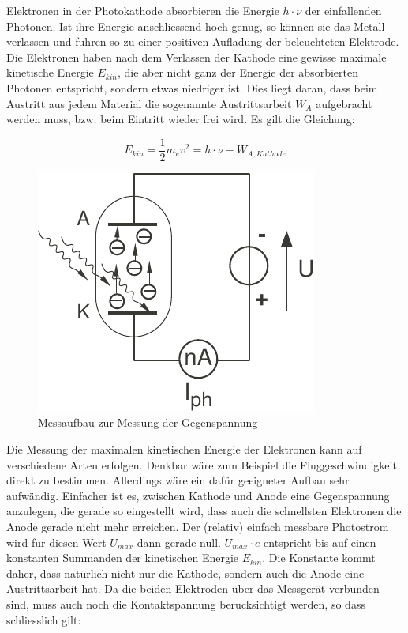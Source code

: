 Elektronen  in  der  Photokathode  absorbieren  die  Energie  $h\cdot\nu$  der
einfallenden Photonen. Ist ihre Energie anschliessend hoch  genug, so k\"onnen
sie das Metall  verlassen  und  fuhren  so  zu  einer  positiven Aufladung der
beleuchteten Elektrode. Die Elektronen haben nach  dem  Verlassen  der Kathode
eine  gewisse  maximale  kinetische Energie $E_{kin}$, die aber nicht ganz der
Energie  der absorbierten Photonen entspricht, sondern  etwas  niedriger  ist.
Dies  liegt  daran,  dass  beim  Austritt  aus  jedem Material die  sogenannte
Austrittsarbeit  $W_A$ aufgebracht werden muss, bzw. beim Eintritt wieder frei
wird. Es gilt die Gleichung:

\begin{equation}
    E_{kin} = \frac{1}{2}m_e v^2 = h\cdot\nu - W_{A,Kathode}
\end{equation}

\begin{figure}
    \centering
    \includegraphics[width=\linewidth]{images/millikan.pdf}
    \caption{Messaufbau zur Messung der Gegenspannung}
    \label{fig:millikan}
\end{figure}

Die  Messung  der  maximalen  kinetischen  Energie  der  Elektronen  kann  auf
verschiedene   Arten   erfolgen.   Denkbar    w\"are    zum    Beispiel    die
Fluggeschwindigkeit  direkt  zu  bestimmen.  Allerdings  w\"are   ein  daf\"ur
geeigneter Aufbau  sehr  aufw\"andig.  Einfacher  ist es, zwischen Kathode und
Anode  eine Gegenspannung anzulegen, die gerade so eingestellt wird, dass auch
die  schnellsten  Elektronen  die  Anode  gerade  nicht  mehr  erreichen.  Der
(relativ) einfach  messbare  Photostrom  wird  fur  diesen Wert $U_{max}$ dann
gerade  null.  $U_{max}\cdot e$ entspricht bis auf einen konstanten  Summanden
der kinetischen Energie $E_{kin}$. Die Konstante kommt daher, dass nat\"urlich
nicht nur die Kathode, sondern auch die Anode eine Austrittsarbeit hat. Da die
beiden  Elektroden  \"uber  das Messger\"at verbunden sind, muss auch noch die
Kontaktspannung   berucksichtigt   werden,   so    dass   schliesslich   gilt:

